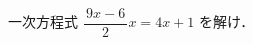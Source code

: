 \documentclass[../../../../hsm_tok_q.tex]{subfiles}
\begin{document}
    
    一次方程式 $\dfrac{\,9x-6\,}{2}x = 4x + 1$ を解け．
\end{document}

